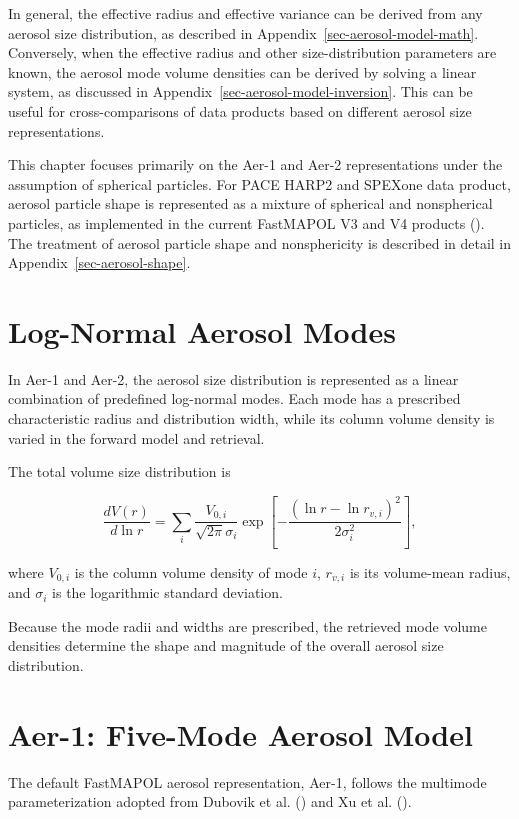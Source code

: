\documentclass[
  11pt,
  letterpaper,
]{scrreprt}
\begin{document}
In general, the effective radius and effective variance can be derived
from any aerosol size distribution, as described in
Appendix~\ref{sec-aerosol-model-math}. Conversely, when the effective
radius and other size-distribution parameters are known, the aerosol
mode volume densities can be derived by solving a linear system, as
discussed in Appendix~\ref{sec-aerosol-model-inversion}. This can be
useful for cross-comparisons of data products based on different aerosol
size representations.

This chapter focuses primarily on the Aer-1 and Aer-2 representations
under the assumption of spherical particles. For PACE HARP2 and SPEXone
data product, aerosol particle shape is represented as a mixture of
spherical and nonspherical particles, as implemented in the current
FastMAPOL V3 and V4 products (). The treatment of aerosol particle shape and nonsphericity is
described in detail in Appendix~\ref{sec-aerosol-shape}.

\section{Log-Normal Aerosol Modes}\label{log-normal-aerosol-modes}

In Aer-1 and Aer-2, the aerosol size distribution is represented as a
linear combination of predefined log-normal modes. Each mode has a
prescribed characteristic radius and distribution width, while its
column volume density is varied in the forward model and retrieval.

The total volume size distribution is

\[
\frac{dV(r)}{d\ln r}
=
\sum_i
\frac{V_{0,i}}{\sqrt{2\pi}\sigma_i}
\exp
\left[
-\frac{(\ln r-\ln r_{v,i})^2}{2\sigma_i^2}
\right],
\]

where \(V_{0,i}\) is the column volume density of mode \(i\),
\(r_{v,i}\) is its volume-mean radius, and \(\sigma_i\) is the
logarithmic standard deviation.

Because the mode radii and widths are prescribed, the retrieved mode
volume densities determine the shape and magnitude of the overall
aerosol size distribution.

\section{Aer-1: Five-Mode Aerosol
Model}\label{aer-1-five-mode-aerosol-model}

The default FastMAPOL aerosol representation, Aer-1, follows the
multimode parameterization adopted from Dubovik et al.
() and Xu et al.
().
\end{document}
